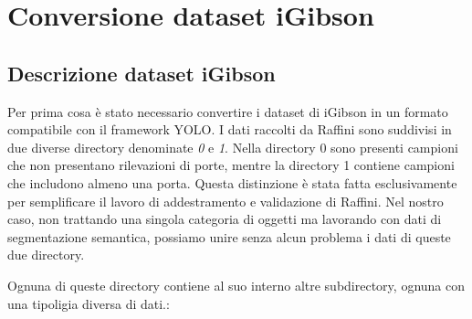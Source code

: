 \documentclass[12pt]{report}
\begin{document}
\section{Conversione dataset iGibson}
\label{chap:conversione_dataset_igibson}

\subsection{Descrizione dataset iGibson}
\label{chap:descrizione_dataset_igibson}

Per prima cosa è stato necessario convertire i dataset di iGibson in un formato compatibile con il framework YOLO. I dati raccolti da Raffini sono suddivisi in due diverse directory denominate \textit{0} e \textit{1}. Nella directory 0 sono presenti campioni che non presentano rilevazioni di porte, mentre la directory 1 contiene campioni che includono almeno una porta. Questa distinzione è stata fatta esclusivamente per semplificare il lavoro di addestramento e validazione di Raffini. Nel nostro caso, non trattando una singola categoria di oggetti ma lavorando con dati di segmentazione semantica, possiamo unire senza alcun problema i dati di queste due directory. 

Ognuna di queste directory contiene al suo interno altre subdirectory, ognuna con una tipoligia diversa di dati.:
\end{document}
